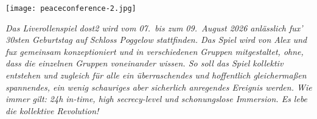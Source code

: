 {\texttt{[image: peaceconference-2.jpg]}}

\vspace{1.5cm}
\emph{Das Liverollenspiel \ac{dost2} wird vom 07.~bis zum 09.~August 2026
anlässlich fux' 30sten Geburtstag auf Schloss Poggelow stattfinden. Das Spiel
wird von Alex und fux gemeinsam konzeptioniert und in verschiedenen Gruppen
mitgestaltet, ohne, dass die einzelnen Gruppen voneinander wissen. So soll das
Spiel kollektiv entstehen und zugleich für alle ein überraschendes und
hoffentlich gleichermaßen spannendes, ein wenig schauriges aber sicherlich
anregendes Ereignis werden. Wie immer gilt: 24h in-time, high secrecy-level und
schonungslose Immersion. Es lebe die kollektive Revolution!}\\


